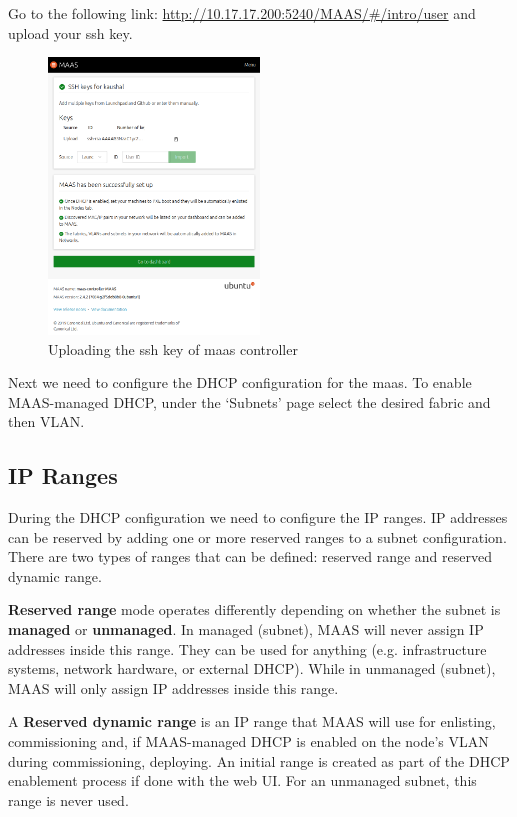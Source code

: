 Go to the following link: \url{http://10.17.17.200:5240/MAAS/#/intro/user} and upload your ssh key.

\begin{figure}[!ht]
    \centering
    \includegraphics[width=0.5\textwidth]{images/4-8.png}
    \caption{Uploading the ssh key of maas controller}
\end{figure}

Next we need to configure the DHCP configuration for the maas. To enable MAAS-managed DHCP, under the ‘Subnets’ page select the desired fabric and then VLAN.

\subsection{IP Ranges}

During the DHCP configuration we need to configure the IP ranges. IP addresses can be reserved by adding one or more reserved ranges to a subnet configuration. There are two types of ranges that can be defined: reserved range and reserved dynamic range.

\textbf{Reserved range} mode operates differently depending on whether the subnet is \textbf{managed} or \textbf{unmanaged}. In managed (subnet), MAAS will never assign IP addresses inside this range. They can be used for anything (e.g. infrastructure systems, network hardware, or external DHCP). While in unmanaged (subnet), MAAS will only assign IP addresses inside this range.

A \textbf{Reserved dynamic range} is an IP range that MAAS will use for enlisting, commissioning and, if MAAS-managed DHCP is enabled on the node's VLAN during commissioning, deploying. An initial range is created as part of the DHCP enablement process if done with the web UI. For an unmanaged subnet, this range is never used.

